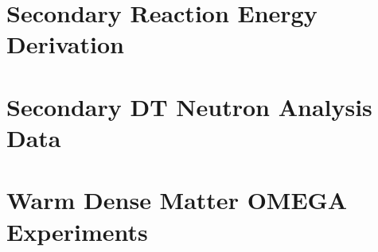 \chapter{Secondary Reaction Energy Derivation}
\label{Secondary Reaction Energy}


\chapter{Secondary DT Neutron Analysis Data}
\label{chap:secondaryDTData}


\chapter{Warm Dense Matter OMEGA Experiments}
\label{apend:wdmData}
